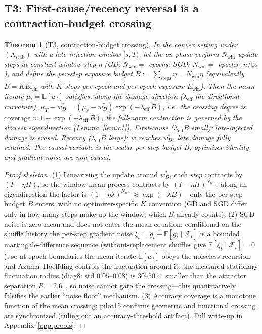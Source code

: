 \documentclass{article}
\newtheorem{theorem}{Theorem}
\newcommand{\Ewin}{E_{\mathrm{win}}}
\newcommand{\B}{B}            %
\newcommand{\lam}{\lambda}
\newcommand{\lameff}{\lam_{\mathrm{eff}}}
\begin{document}
\subsection{T3: First-cause/recency reversal is a contraction-budget crossing}
\label{sec:t3}

\begin{theorem}[T3, contraction-budget crossing]
\label{thm:t3}
In the convex setting under $(\mathrm{A}_{\mathrm{stab}})$ with a late injection window $[s,T)$,
let the on-phase perform $N_{\mathrm{win}}$ update steps at constant window step $\eta$
(GD: $N_{\mathrm{win}}{=}$ epochs; SGD: $N_{\mathrm{win}}{=}$ epochs$\times n/\mathrm{bs}$),
and define the \emph{per-step exposure budget} $\B:=\sum_{\text{steps}}\eta=N_{\mathrm{win}}\eta$
(equivalently $\B=K\Ewin$ with $K$ steps per epoch and per-epoch exposure $\Ewin$).
Then the mean iterate $\mu_t=\mathbb{E}[w_t]$ satisfies, \emph{along the damage
direction} ($\lameff$ the directional curvature),
$\mu_T-w^*_D=(\mu_s-w^*_D)\exp(-\lameff\,\B)$, i.e.\ the crossing degree is
$\mathrm{coverage}\approx1-\exp(-\lameff\,\B)$; the full-norm contraction is
governed by the slowest eigendirection (Lemma~\ref{lem:c1}).
\emph{First-cause} ($\lameff\B$ small): late-injected damage is erased. \emph{Recency}
($\lameff\B$ large): $w$ reaches $w^*_D$, late damage fully retained. The causal variable is the
scalar per-step budget $\B$; optimizer identity and gradient noise are non-causal.
\end{theorem}

\begin{proof}[Proof skeleton]
(1) Linearizing the update around $w^*_D$, each \emph{step} contracts by $(I-\eta H)$, so the
window mean process contracts by $(I-\eta H)^{N_{\mathrm{win}}}$; along an eigendirection the
factor is $(1-\eta\lambda)^{N_{\mathrm{win}}}\approx\exp(-\lambda\B)$---only the per-step
budget $\B$ enters, with no optimizer-specific $K$ convention (GD and SGD differ only in how
many steps make up the window, which $\B$ already counts). (2) SGD noise is zero-mean and does
not enter the mean equation: conditional on the shuffle history the per-step gradient noise
$\xi_t=g_t-\mathbb{E}[g_t\mid\mathcal{F}_t]$ is a bounded martingale-difference sequence
(without-replacement shuffles give
$\mathbb{E}[\xi_t\mid\mathcal{F}_t]=0$), so at epoch boundaries the mean iterate
$\mathbb{E}[w_t]$ obeys the noiseless recursion and
Azuma--Hoeffding controls the fluctuation around it; the measured stationary
fluctuation radius (diag8: std $0.05$--$0.08$) is $30$--$50\times$ smaller than the
attractor separation $R=2.61$, so noise cannot gate the crossing---this quantitatively falsifies
the earlier ``noise floor'' mechanism. (3) Accuracy coverage is a monotone function of the mean
crossing; pilot15 confirms geometric and functional crossing are synchronized (ruling out an
accuracy-threshold artifact). Full write-up in Appendix~\ref{app:proofs}.
\end{proof}
\end{document}
